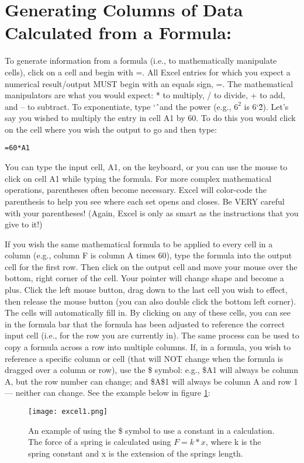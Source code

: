 \section*{Generating Columns of Data Calculated from a Formula:}
To generate information from a formula (i.e., to mathematically manipulate cells), click on a cell and begin with =. 
All Excel entries for which you expect a numerical result/output MUST begin with an equals sign, =. 
The mathematical manipulators are what you would expect: * to multiply, / to divide, + to add, and – to subtract. 
To exponentiate, type \char`\^ \ and the power (e.g., $6^{2}$ is 6\char`\^2). 
Let's say you wished to multiply the entry in cell A1 by 60. 
To do this you would click on the cell where you wish the output to go and then type:

\medskip
\texttt{=60*A1}
\medskip

You can type the input cell, A1, on the keyboard, or you can use the mouse to click on cell A1 while typing the formula. 
For more complex mathematical operations, parentheses often become necessary. 
Excel will color-code the parenthesis to help you see where each set opens and closes. 
Be VERY careful with your parentheses!
(Again, Excel is only as smart as the instructions that you give to it!)
\par 
If you wish the same mathematical formula to be applied to every cell in a column (e.g., column F is column A times 60), type the formula into the output cell for the first row. 
Then click on the output cell and move your mouse over the bottom, right corner of the cell. 
Your pointer will change shape and become a plus. 
Click the left mouse button, drag down to the last cell you wish to effect, then release the mouse button (you can also double click the bottom left corner). 
The cells will automatically fill in. 
By clicking on any of these cells, you can see in the formula bar that the formula has been adjusted to reference the correct input cell (i.e., for the row you are currently in). 
The same process can be used to copy a formula across a row into multiple columns. 
If, in a formula, you wish to reference a specific column or cell (that will NOT change when the formula is dragged over a column or row), use the \$ symbol: e.g., \$A1 will always be column A, but the row number can change; and \$A\$1 will always be column A and row 1 — neither can change. See the example below in figure \ref{fig:exc1}:

\begin{figure}[ht]
\texttt{[image: excel1.png]}
\centering
\caption{An example of using the \$ symbol to use a constant in a calculation. The force of a spring is calculated using $F=k * x$, where k is the spring constant and x is the extension of the springs length.}
\label{fig:exc1}
\end{figure}

